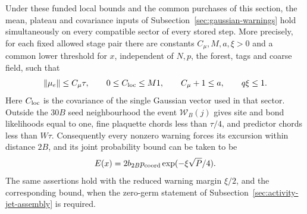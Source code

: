 \begin{lemma}
\label{lem:selected-warning-inputs}
Under these funded local bounds and the common purchases of this section,
the mean, plateau and covariance inputs of
Subsection~\ref{sec:gaussian-warnings} hold simultaneously on every
compatible sector of every stored step. More precisely, for each fixed
allowed stage pair there are constants $C_\mu,M,a,\xi>0$ and a common
lower threshold for $x$, independent of $N,p$, the forest, tags and
coarse field, such that
\[
 \|\mu_e\|\le C_\mu\tau,\qquad
 0\le C_{\rm loc}\le M1,\qquad
 C_\mu+1\le a,\qquad q\xi\le1.
\]
Here $C_{\rm loc}$ is the covariance of the single Gaussian vector
used in that sector. Outside the $30B$ seed neighbourhood the event
$\mathcal W_B(j)$ gives site and bond likelihoods equal to one, fine
plaquette chords less than $\tau/4$, and predictor chords less than
$W\tau$. Consequently every nonzero warning forces its excursion
within distance $2B$, and its joint probability bound can be taken to be
\[
 E(x)=2b_{2B}p_{\rm coord}\exp(-\xi\sqrt P/4).
\]
The same assertions hold with the reduced warning margin $\xi/2$,
and the corresponding bound, when the zero-germ statement of
Subsection~\ref{sec:activity-jet-assembly} is required.
\end{lemma}

